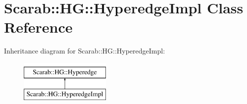 \hypertarget{classScarab_1_1HG_1_1HyperedgeImpl}{
\section{Scarab::HG::HyperedgeImpl Class Reference}
\label{classScarab_1_1HG_1_1HyperedgeImpl}
}
Inheritance diagram for Scarab::HG::HyperedgeImpl:\begin{figure}[H]
\begin{center}
\leavevmode
\includegraphics[height=2cm]{classScarab_1_1HG_1_1HyperedgeImpl}
\end{center}
\end{figure}
